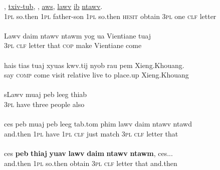\documentclass[output=paper]{LSP/langsci}
\begin{document}
\begin{exe}
\ex \label{Jaex:19af}
\begin{xlist}
\ex \label{Jaex:19a}
\gll \underline{} \underline{}, \underline{} \underline{txiv-tub}, \underline{} \underline{},     \underline{aws}, \underline{} \underline{lawv} \underline{ib}     \underline{}  \underline{ntawv}.\\
1\textsc{pl} so.then 1\textsc{pl} father-son 1\textsc{pl} so.then \textsc{hesit} obtain 3\textsc{pl} one \textsc{clf} letter\\
\glt {}\\
\ex \label{Jaex:19b}
\gll Lawv daim ntawv ntawm yog ua Vientiane tuaj\\
 3\textsc{pl} \textsc{clf} letter that \textsc{cop} make  Vientiane come\\ 
\glt {}\\
\ex \label{Jaex:19c}
\gll hais tias tuaj xyuas  kwv.tij nyob rau pem Xieng.Khouang.\\		
say \textsc{comp} come visit  relative live to place.up Xieng.Khouang\\ 
\glt {}\\
\ex \label{Jaex:19d}
\gll sLawv muaj peb  leeg  thiab\\
     3\textsc{pl} have three people also \\ 
\glt {}\\
\ex \label{Jaex:19e}
\gll ces peb muaj peb leeg tab.tom phim  lawv daim ntawv ntawd\\
     and.then 1\textsc{pl} have 1\textsc{pl} \textsc{clf} just  match 3\textsc{pl} \textsc{clf} letter  that\\ 
\glt {}\\
\ex \label{Jaex:19f}
\gll ces \textbf{peb} \textbf{thiaj}  \textbf{yuav} \textbf{lawv} \textbf{daim} \textbf{ntawv} \textbf{ntawm}, ces...\\		           
 and.then  1\textsc{pl} so.then obtain 3\textsc{pl} \textsc{clf} letter  that  and.then\\
\glt {} \citep[][227]{fuller85}
\end{xlist}
\end{exe}
\end{document}
